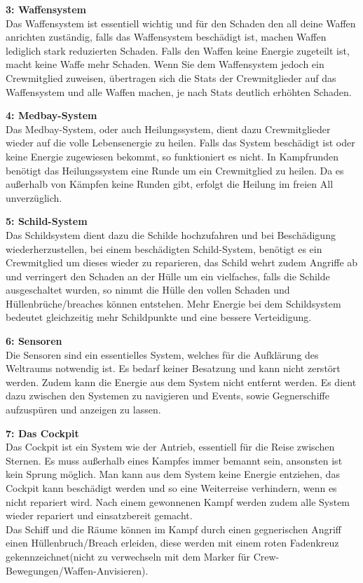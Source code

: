 \documentclass[fontsize=12pt,paper=a4,twoside]{scrartcl}
\begin{document}
\textbf{3: Waffensystem}
\\
Das Waffensystem ist essentiell wichtig und für den Schaden den all deine Waffen anrichten zuständig, falls das Waffensystem beschädigt ist, machen Waffen lediglich stark reduzierten Schaden. Falls den Waffen keine Energie zugeteilt ist, macht keine Waffe mehr Schaden. Wenn Sie dem Waffensystem jedoch ein Crewmitglied zuweisen, übertragen sich die Stats der Crewmitglieder auf das Waffensystem und alle Waffen machen, je nach Stats deutlich erhöhten Schaden.

\textbf{4: Medbay-System} 
\\
Das Medbay-System, oder auch Heilungssystem, dient dazu Crewmitglieder wieder auf die volle Lebensenergie zu heilen.
Falls das System beschädigt ist oder keine Energie zugewiesen bekommt, so funktioniert es nicht. In Kampfrunden benötigt das Heilungssystem eine Runde um ein Crewmitglied zu heilen. Da es außerhalb von Kämpfen keine Runden gibt, erfolgt die Heilung im freien All unverzüglich. 

\textbf{5: Schild-System}
\\
Das Schildsystem dient dazu die Schilde hochzufahren und bei Beschädigung wiederherzustellen, bei einem beschädigten Schild-System, benötigt es ein Crewmitglied um dieses wieder zu reparieren, das Schild wehrt zudem Angriffe ab und verringert den Schaden an der Hülle um ein vielfaches, falls die Schilde ausgeschaltet wurden, so nimmt die Hülle den vollen Schaden und Hüllenbrüche/breaches können entstehen. Mehr Energie bei dem Schildsystem bedeutet gleichzeitig mehr Schildpunkte und eine bessere Verteidigung.

\textbf{6: Sensoren}
\\
Die Sensoren sind ein essentielles System, welches für die Aufklärung des Weltraums notwendig ist. Es bedarf keiner Besatzung und kann nicht zerstört werden. Zudem kann die Energie aus dem System nicht entfernt werden. Es dient dazu zwischen den Systemen zu navigieren und Events, sowie Gegnerschiffe aufzuspüren und anzeigen zu lassen.

\textbf{7: Das Cockpit}
\\
Das Cockpit ist ein System wie der Antrieb, essentiell für die Reise zwischen Sternen. Es muss außerhalb eines Kampfes immer bemannt sein, ansonsten ist kein Sprung möglich. Man kann aus dem System keine Energie entziehen, das Cockpit kann beschädigt werden und so eine Weiterreise verhindern, wenn es nicht repariert wird. Nach einem gewonnenen Kampf werden zudem alle System wieder repariert und einsatzbereit gemacht.
\\
Das Schiff und die Räume können im Kampf durch einen gegnerischen Angriff einen Hüllenbruch/Breach erleiden, diese werden mit einem roten Fadenkreuz gekennzeichnet(nicht zu verwechseln mit dem Marker für Crew-Bewegungen/Waffen-Anvisieren).
\end{document}
